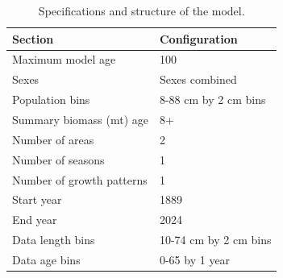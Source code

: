 \documentclass[
  english,
]{article}
\begin{document}
\begin{longtable}{ll}

\caption{\label{tbl-model-config}Specifications and structure of the
model.}

\tabularnewline

\toprule
Section & Configuration \\ 
\midrule\addlinespace[2.5pt]
Maximum model age & 100 \\ 
Sexes & Sexes combined \\ 
Population bins & 8-88 cm by 2 cm bins \\ 
Summary biomass (mt) age & 8+ \\ 
Number of areas & 2 \\ 
Number of seasons & 1 \\ 
Number of growth patterns & 1 \\ 
Start year & 1889 \\ 
End year & 2024 \\ 
Data length bins & 10-74 cm by 2 cm bins \\ 
Data age bins & 0-65 by 1 year \\ 
\bottomrule

\end{longtable}

\endgroup

\clearpage

\begingroup
\fontsize{9.0pt}{11.0pt}\selectfont
\end{document}
